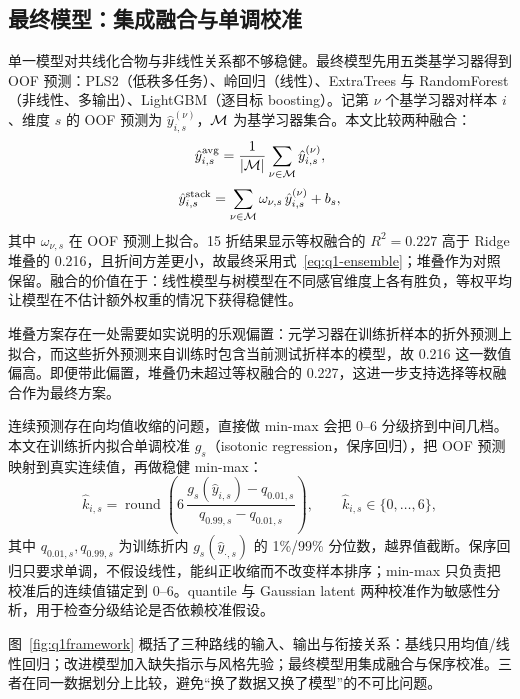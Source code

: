 \subsection{最终模型：集成融合与单调校准}

单一模型对共线化合物与非线性关系都不够稳健。最终模型先用五类基学习器得到 OOF 预测：PLS2（低秩多任务）、岭回归（线性）、ExtraTrees 与 RandomForest（非线性、多输出）、LightGBM（逐目标 boosting）。记第 $\nu$ 个基学习器对样本 $i$、维度 $s$ 的 OOF 预测为 $\hat{y}_{i,s}^{(\nu)}$，$\mathcal{M}$ 为基学习器集合。本文比较两种融合：
\begin{equation}
  \hat{y}_{i,s}^{\mathrm{avg}}=\frac{1}{\left\lvert \mathcal{M} \right\rvert}\sum_{\nu\in\mathcal{M}}\hat{y}_{i,s}^{(\nu)},
  \label{eq:q1-ensemble}
\end{equation}
\begin{equation}
  \hat{y}_{i,s}^{\mathrm{stack}}=\sum_{\nu\in\mathcal{M}}\omega_{\nu,s}\,\hat{y}_{i,s}^{(\nu)}+b_s,
  \label{eq:q1-stack}
\end{equation}
其中 $\omega_{\nu,s}$ 在 OOF 预测上拟合。15 折结果显示等权融合的 $R^2=0.227$ 高于 Ridge 堆叠的 0.216，且折间方差更小，故最终采用式~\eqref{eq:q1-ensemble}；堆叠作为对照保留。融合的价值在于：线性模型与树模型在不同感官维度上各有胜负，等权平均让模型在不估计额外权重的情况下获得稳健性。

堆叠方案存在一处需要如实说明的乐观偏置：元学习器在训练折样本的折外预测上拟合，而这些折外预测来自训练时包含当前测试折样本的模型，故 0.216 这一数值偏高。即便带此偏置，堆叠仍未超过等权融合的 0.227，这进一步支持选择等权融合作为最终方案。

连续预测存在向均值收缩的问题，直接做 min-max 会把 0--6 分级挤到中间几档。本文在训练折内拟合单调校准 $g_s$（isotonic regression，保序回归），把 OOF 预测映射到真实连续值，再做稳健 min-max：
\begin{equation}
  \hat{k}_{i,s}=\operatorname{round}\left(
  6\,\frac{g_s(\hat{y}_{i,s})-q_{0.01,s}}{q_{0.99,s}-q_{0.01,s}}
  \right),\qquad \hat{k}_{i,s}\in\{0,\dots,6\},
  \label{eq:q1-grade}
\end{equation}
其中 $q_{0.01,s},q_{0.99,s}$ 为训练折内 $g_s(\hat{y}_{\cdot,s})$ 的 1\%/99\% 分位数，越界值截断。保序回归只要求单调，不假设线性，能纠正收缩而不改变样本排序；min-max 只负责把校准后的连续值锚定到 0--6。quantile 与 Gaussian latent 两种校准作为敏感性分析，用于检查分级结论是否依赖校准假设。


图~\ref{fig:q1framework} 概括了三种路线的输入、输出与衔接关系：基线只用均值/线性回归；改进模型加入缺失指示与风格先验；最终模型用集成融合与保序校准。三者在同一数据划分上比较，避免“换了数据又换了模型”的不可比问题。

